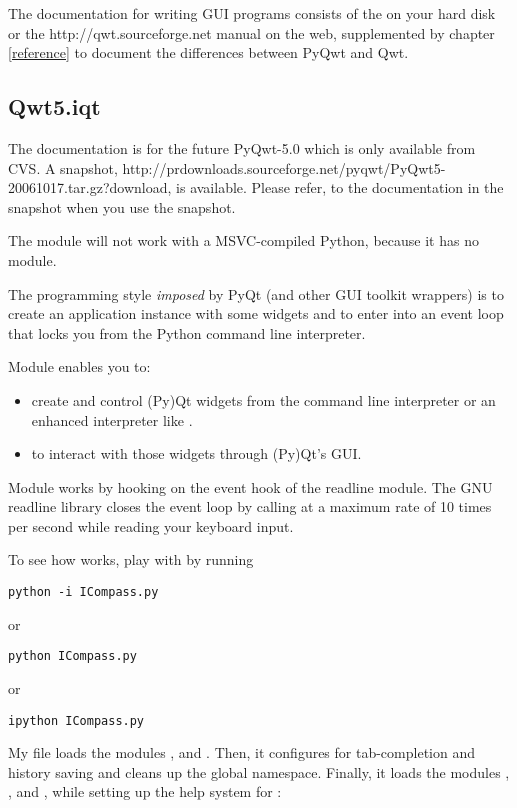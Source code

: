 \documentclass{manual}
\newcommand{\Qwt}{\ulink{Qwt}
  {http://qwt.sourceforge.net}}
\newcommand{\cvs}{20061017}
\newcommand{\PyQwtTarGz}{\ulink{PyQwt5-\cvs.tar.gz}
  {http://prdownloads.sourceforge.net/pyqwt/PyQwt5-\cvs.tar.gz?download}}
\newcommand{\Future}{
  \begin{notice}[warning]
    The documentation is for the future PyQwt-5.0 which is only available from
    CVS. A snapshot, \PyQwtTarGz{}, is available. Please refer, to the
    documentation in the snapshot when you use the snapshot.
  \end{notice}
}
\begin{document}
The documentation for writing GUI programs consists of the
 on your hard disk or the \Qwt{} manual on
the web, supplemented by chapter \ref{reference} to document the differences
between PyQwt and Qwt.


\subsection{Qwt5.iqt
  \label{iqt-intro}}

\Future{}

\begin{notice}[warning]
  The module  will not work with a MSVC-compiled Python, because
  it has no  module.
\end{notice}

The programming style \emph{imposed} by PyQt (and other GUI toolkit wrappers)
is to create an application instance with some widgets and to enter into an
event loop that locks you from the Python command line interpreter.

Module  enables you to:
\begin{itemize}
\item
  create and control (Py)Qt widgets from the command line interpreter or an
  enhanced interpreter like .
\item
  to interact with those widgets through (Py)Qt's GUI.
\end{itemize}

Module  works by hooking  on the
event hook of the readline module.
The GNU readline library closes the event loop by calling 
 at a maximum rate of 10 times per second
while reading your keyboard input.

To see how  works, play with  by running
\begin{verbatim}
python -i ICompass.py
\end{verbatim}
or
\begin{verbatim}
python ICompass.py
\end{verbatim}
or
\begin{verbatim}
ipython ICompass.py
\end{verbatim}

My  file loads the modules ,
 and .  Then, it configures 
for tab-completion and history saving and cleans up the global namespace.
Finally, it loads the modules , , and ,
while setting up the help system for :

\end{document}
